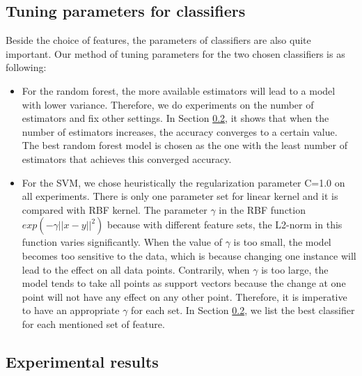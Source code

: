 \documentclass{article}
\begin{document}
\subsection{Tuning parameters for classifiers}
Beside the choice of features, the parameters of classifiers are also quite important. Our method of tuning parameters for the two chosen classifiers is as following:
\begin{itemize}
\item For the random forest, the more available estimators will lead to a model with lower variance. Therefore, we do experiments on the number of estimators and fix other settings. In Section \ref{sec:result}, it shows that when the number of estimators increases, the accuracy converges to a certain value. The best random forest model is chosen as the one with the least number of estimators that achieves this converged accuracy.
\item For the SVM, we chose heuristically the regularization parameter C=1.0 on all experiments. There is only one parameter set for linear kernel and it is compared with RBF kernel. The parameter $\gamma$ in the RBF function $exp(-\gamma||x-y||^2)$ because with different feature sets, the L2-norm in this function varies significantly. When the value of $\gamma$ is too small, the model becomes too sensitive to the data, which is because changing one instance will lead to the effect on all data points. Contrarily, when $\gamma$ is too large, the model tends to take all points as support vectors because the change at one point will not have any effect on any other point. Therefore, it is imperative to have an appropriate $\gamma$ for each set. In Section \ref{sec:result}, we list the best classifier for each mentioned set of feature.
\end{itemize}

\subsection{Experimental results}
\label{sec:result}
\end{document}
